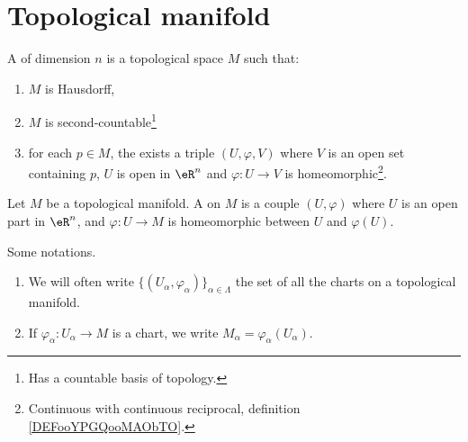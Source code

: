 

\section{Topological manifold}

\begin{definition}				\label{DEFooJOMAooZscKwn}
	A  of dimension \( n\) is a topological space \( M\) such that:
	\begin{enumerate}
		\item		\label{ITEMooZZXHooPICcjz}
		      \( M\) is Hausdorff,
		\item		\label{ITEMooKOSMooSawqbB}
		      \( M\) is second-countable\footnote{Has a countable basis of topology.}
		\item		\label{ITEMooJOPDooPiOadZ}
		      for each \( p\in M\), the exists a triple \( (U,\varphi,V)\) where \( V\) is an open set containing \( p\), \( U\) is open in \( \eR^n\) and \(\varphi \colon U\to V  \) is homeomorphic\footnote{Continuous with continuous reciprocal, definition \ref{DEFooYPGQooMAObTO}.}.
	\end{enumerate}
\end{definition}

\begin{definition}		\label{DEFooKUJWooXHoCFI}
	Let \( M\) be a topological manifold. A  on \( M\) is a couple \( (U,\varphi)\) where \( U\) is an open part in \( \eR^n\), and \(\varphi \colon U\to M \) is homeomorphic between \( U\) and \( \varphi(U)\).
\end{definition}

\begin{normaltext}
	Some notations.
	\begin{enumerate}
		\item
		      We will often write \( \{ (U_{\alpha}, \varphi_{\alpha})\}_{\alpha\in \Lambda}\) the set of all the charts on a topological manifold.
		\item
		      If \(\varphi_{\alpha} \colon U_{\alpha}\to M  \) is a chart, we write \( M_{\alpha}=\varphi_{\alpha}(U_{\alpha})\).
	\end{enumerate}
\end{normaltext}

